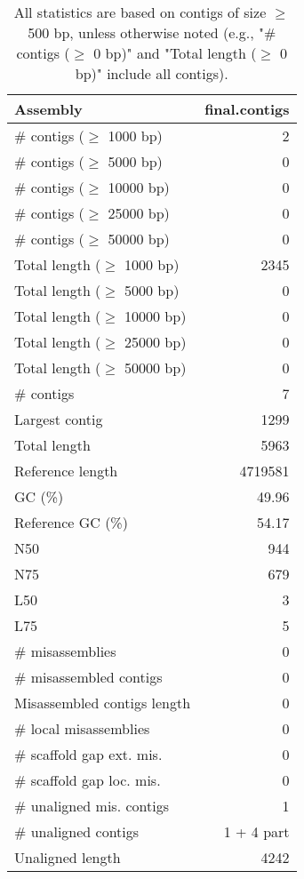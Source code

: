 \documentclass[12pt,a4paper]{article}
\begin{document}
\begin{table}[ht]
\begin{center}
\caption{All statistics are based on contigs of size $\geq$ 500 bp, unless otherwise noted (e.g., "\# contigs ($\geq$ 0 bp)" and "Total length ($\geq$ 0 bp)" include all contigs).}
\begin{tabular}{|l*{1}{|r}|}
\hline
Assembly & final.contigs \\ \hline
\# contigs ($\geq$ 1000 bp) & 2 \\ \hline
\# contigs ($\geq$ 5000 bp) & 0 \\ \hline
\# contigs ($\geq$ 10000 bp) & 0 \\ \hline
\# contigs ($\geq$ 25000 bp) & 0 \\ \hline
\# contigs ($\geq$ 50000 bp) & 0 \\ \hline
Total length ($\geq$ 1000 bp) & 2345 \\ \hline
Total length ($\geq$ 5000 bp) & 0 \\ \hline
Total length ($\geq$ 10000 bp) & 0 \\ \hline
Total length ($\geq$ 25000 bp) & 0 \\ \hline
Total length ($\geq$ 50000 bp) & 0 \\ \hline
\# contigs & 7 \\ \hline
Largest contig & 1299 \\ \hline
Total length & 5963 \\ \hline
Reference length & 4719581 \\ \hline
GC (\%) & 49.96 \\ \hline
Reference GC (\%) & 54.17 \\ \hline
N50 & 944 \\ \hline
N75 & 679 \\ \hline
L50 & 3 \\ \hline
L75 & 5 \\ \hline
\# misassemblies & 0 \\ \hline
\# misassembled contigs & 0 \\ \hline
Misassembled contigs length & 0 \\ \hline
\# local misassemblies & 0 \\ \hline
\# scaffold gap ext. mis. & 0 \\ \hline
\# scaffold gap loc. mis. & 0 \\ \hline
\# unaligned mis. contigs & 1 \\ \hline
\# unaligned contigs & 1 + 4 part \\ \hline
Unaligned length & 4242 \\ \hline

\end{tabular}
\end{center}
\end{table}
\end{document}

